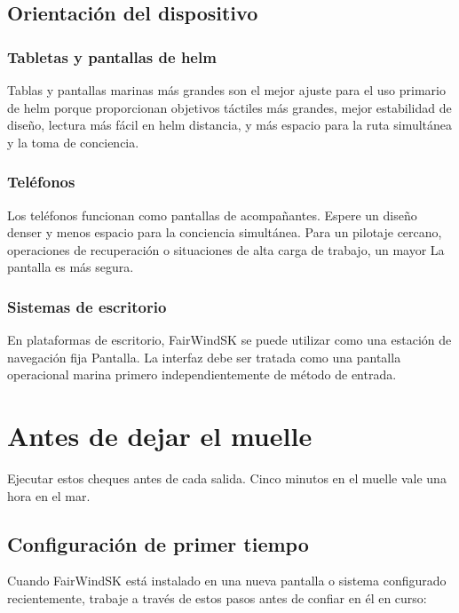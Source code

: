 \section{Orientación del dispositivo}

\subsection{Tabletas y pantallas de helm}

Tablas y pantallas marinas más grandes son el mejor ajuste para el uso primario de helm porque
proporcionan objetivos táctiles más grandes, mejor estabilidad de diseño, lectura más fácil en helm
distancia, y más espacio para la ruta simultánea y la toma de conciencia.

\subsection{Teléfonos}

Los teléfonos funcionan como pantallas de acompañantes.
Espere un diseño denser y menos espacio para la conciencia simultánea.
Para un pilotaje cercano, operaciones de recuperación o situaciones de alta carga de trabajo, un mayor
La pantalla es más segura.

\subsection{Sistemas de escritorio}

En plataformas de escritorio, FairWindSK se puede utilizar como una estación de navegación fija
Pantalla.
La interfaz debe ser tratada como una pantalla operacional marina primero independientemente
de método de entrada.

\chapter{Antes de dejar el muelle}

Ejecutar estos cheques antes de cada salida.
Cinco minutos en el muelle vale una hora en el mar.

\section{Configuración de primer tiempo}

Cuando FairWindSK está instalado en una nueva pantalla o sistema configurado recientemente, trabaje
a través de estos pasos antes de confiar en él en curso:

